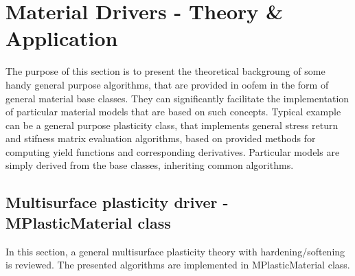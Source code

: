 \documentclass[a4paper]{article}
\begin{document}
\clearpage

\section{Material Drivers - Theory \& Application}
The purpose of this section is to present the theoretical backgroung
of some handy general purpose algorithms, that are provided in oofem in the
form of general material base classes. They can significantly
facilitate the implementation of particular material models that are
based on such concepts. Typical example can be a general purpose
plasticity class, that implements general stress return and stifness
matrix evaluation algorithms, based on provided methods for computing
yield functions and corresponding derivatives. Particular
models are simply derived from the base classes, inheriting
common algorithms.



\subsection{Multisurface plasticity driver - MPlasticMaterial class}

In this section, a general multisurface plasticity theory with
hardening/softening is reviewed. The presented algorithms are
implemented in MPlasticMaterial class.
\end{document}
